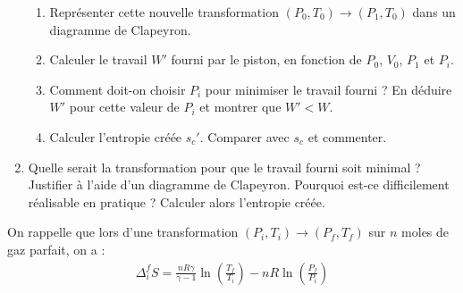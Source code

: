 \begin{enumerate}
\begin{itemize}
\end{itemize}

\begin{enumerate}

\item Représenter cette nouvelle transformation $(P_0, T_0)\rightarrow (P_1, T_0)$ dans un diagramme de Clapeyron.
\item Calculer le travail $W'$ fourni par le piston, en fonction de $P_0$, $V_0$, $P_1$ et $P_i$.
\item Comment doit-on choisir $P_i$ pour minimiser le travail fourni ? En déduire $W'$ pour cette valeur de $P_i$ et montrer que $W'<W$.
\item Calculer l'entropie créée $s_c'$. Comparer avec $s_c$ et commenter.

\end{enumerate}

\item Quelle serait la transformation pour que le travail fourni soit minimal ? Justifier à l'aide d'un diagramme de Clapeyron. Pourquoi est-ce difficilement réalisable en pratique ? Calculer alors l'entropie créée.

\end{enumerate}

On rappelle que lors d'une transformation $(P_i,T_i)\rightarrow  (P_f, T_f)$ sur $n$ moles de gaz parfait, on a :
\begin{align*}
	\Delta_i^f S=\frac{nR\gamma}{\gamma-1}\ln\left(\frac{T_f}{T_i} \right) - nR\ln\left(\frac{P_f}{P_i} \right)
\end{align*}

\newpage

